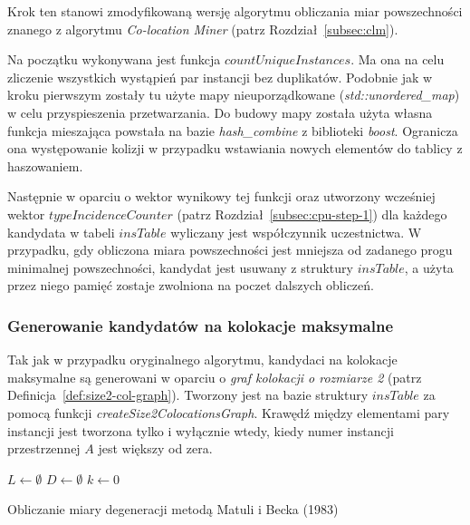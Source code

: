 \documentclass[12pt]{article}
\makeatletter
\newcounter{algorytm}
\newenvironment{algorytm}[1][htb]
  {
  \renewcommand*{\algorithmcfname}{Algorytm}%
  \let\c@algocf\c@algorytm
   \begin{algorithm}[#1]
  }
  {\end{algorithm}}
\makeatother
\begin{document}
Krok ten stanowi zmodyfikowaną wersję algorytmu obliczania miar powszechności znanego z algorytmu \textit{Co-location Miner} (patrz Rozdział~\ref{subsec:clm}).

Na początku wykonywana jest funkcja $ countUniqueInstances$. Ma ona na celu zliczenie wszystkich wystąpień par instancji bez duplikatów. Podobnie jak w kroku pierwszym zostały tu użyte mapy nieuporządkowane (\textit{std::unordered\_map}) w celu przyspieszenia przetwarzania. Do budowy mapy została użyta własna funkcja mieszająca powstała na bazie \textit{hash\_combine} z biblioteki \textit{boost}. Ogranicza ona występowanie kolizji w przypadku wstawiania nowych elementów do tablicy z haszowaniem.

Następnie w oparciu o wektor wynikowy tej funkcji oraz utworzony wcześniej wektor $ typeIncidenceCounter$ (patrz Rozdział~\ref{subsec:cpu-step-1}) dla każdego kandydata w tabeli $ insTable $ wyliczany jest współczynnik uczestnictwa. W przypadku, gdy obliczona miara powszechności jest mniejsza od zadanego progu minimalnej powszechności, kandydat jest usuwany z struktury $ insTable $, a użyta przez niego pamięć zostaje zwolniona na poczet dalszych obliczeń.

\subsubsection{Generowanie kandydatów na kolokacje maksymalne}

Tak jak w przypadku oryginalnego algorytmu, kandydaci na kolokacje maksymalne są generowani w oparciu o \textit{graf kolokacji o rozmiarze 2} (patrz Definicja~\ref{def:size2-col-graph}). Tworzony jest na bazie struktury $ insTable $ za pomocą funkcji \textit{createSize2ColocationsGraph}. Krawędź między elementami pary instancji jest tworzona tylko i wyłącznie wtedy, kiedy numer instancji przestrzennej $ A $ jest większy od zera. 

\begin{algorytm}
$L \leftarrow \emptyset$\; 
$D \leftarrow \emptyset$\;
$k \leftarrow 0$\;
\caption{Obliczanie miary degeneracji metodą Matuli i Becka (1983)}
\label{alg:matusiak}
\end{algorytm}
\end{document}
